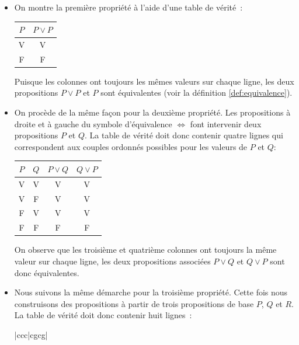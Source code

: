 \documentclass[10pt,notheorems]{beamer}
\theoremstyle{plain}
\theoremstyle{definition} %
\begin{document}
  \begin{notes}
    \begin{itemize}
    \item On montre la première propriété à l'aide d'une table de
      vérité :
      \begin{table}
        \centering
        \begin{tabular}[H]{|c|c|}
          \hline
          $P$ & $P \lor P$ \\ \hline
          V & V \\
          F & F \\
          \hline\hline
        \end{tabular}
      \end{table}
      Puisque les colonnes ont toujours les mêmes valeurs sur chaque
      ligne, les deux propositions $P\lor P$ et $P$ sont équivalentes
      (voir la définition \autoref{def:equivalence}).
    \item On procède de la même façon pour la deuxième propriété. Les
      propositions à droite et à gauche du symbole d'équivalence
      $\Leftrightarrow$ font intervenir deux propositions $P$ et
      $Q$. La table de vérité doit donc contenir quatre lignes qui
      correspondent aux couples ordonnés possibles pour les
      valeurs de $P$ et $Q$:
      \begin{table}[H]
        \centering
        \begin{tabular}[H]{|cc|cc|}
          \hline
          $P$ & $Q$ & $P \lor Q$ & $Q \lor P$\\ \hline
          V & V & V & V\\
          V & F & V & V\\
          F & V & V & V\\
          F & F & F & F \\
          \hline\hline
        \end{tabular}
      \end{table}
      On observe que les troisième et quatrième colonnes ont toujours
      la même valeur sur chaque ligne, les deux propositions associées
      $P \lor Q$ et $Q \lor P$ sont donc
      équivalentes.
    \item Nous suivons la même démarche pour la troisième
      propriété. Cette fois nous construisons des propositions à
      partir de trois propositions de base $P$, $Q$ et $R$. La table
      de vérité doit donc contenir huit lignes :
      \begin{table}[H]
        \centering
        \begin{tabular}[H]{|ccc|cgcg|}

\end{tabular}
\end{table}
\end{itemize}
\end{notes}
\end{document}

